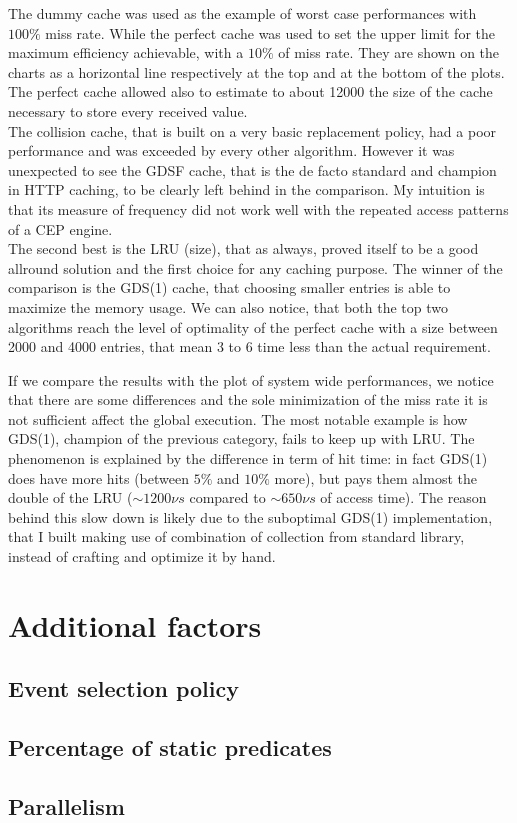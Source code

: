 The dummy cache was used as the example of worst case performances with $100\%$ miss rate. While the perfect cache was used to set the upper limit for the maximum efficiency achievable, with a $10\%$ of miss rate. They are shown on the charts as a horizontal line respectively at the top and at the bottom of the plots. The perfect cache allowed also to estimate to about 12000 the size of the cache necessary to store every received value.\\
The collision cache, that is built on a very basic replacement policy, had a poor performance and was exceeded by every other algorithm. However it was unexpected to see the GDSF cache, that is the de facto standard and champion in HTTP caching, to be clearly left behind in the comparison. My intuition is that its measure of frequency did not work well with the repeated access patterns of a CEP engine.\\
The second best is the LRU (size), that as always, proved itself to be a good allround solution and the first choice for any caching purpose. The winner of the comparison is the GDS(1) cache, that choosing smaller entries is able to maximize the memory usage. We can also notice, that both the top two algorithms reach the level of optimality of the perfect cache with a size between 2000 and 4000 entries, that mean 3 to 6 time less than the actual requirement.

If we compare the results with the plot of system wide performances, we notice that there are some differences and the sole minimization of the miss rate it is not sufficient affect the global execution. The most notable example is how GDS(1), champion of the previous category, fails to keep up with LRU. The phenomenon is explained by the difference in term of hit time: in fact GDS(1) does have more hits (between $5\%$ and $10\%$ more), but pays them almost the double of the LRU ($\sim 1200 \nu s$ compared to $\sim 650 \nu s$ of access time). The reason behind this slow down is likely due to the suboptimal GDS(1) implementation, that I built making use of combination of collection from standard library, instead of crafting and optimize it by hand.

\section{Additional factors}
\subsection{Event selection policy}
\subsection{Percentage of static predicates}
\subsection{Parallelism}
